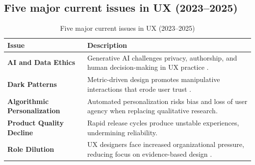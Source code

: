     \subsection{Five major current issues in UX (2023--2025)}
    \begin{table}[H]
        \centering
        \caption{Five major current issues in UX (2023--2025)}
        \begin{tabular}{p{4cm} p{13cm}}
        \hline
        \textbf{Issue} & \textbf{Description} \\
        \hline
        \textbf{AI and Data Ethics} & Generative AI challenges privacy, authorship, and human decision-making in UX practice \cite{shneiderman2022}. \\
        \textbf{Dark Patterns} & Metric-driven design promotes manipulative interactions that erode user trust \cite{mathur2019}. \\
        \textbf{Algorithmic Personalization} & Automated personalization risks bias and loss of user agency when replacing qualitative research. \\
        \textbf{Product Quality Decline} & Rapid release cycles produce unstable experiences, undermining reliability. \\
        \textbf{Role Dilution} & UX designers face increased organizational pressure, reducing focus on evidence-based design \cite{rosenfeld2018}. \\
        \hline
        \end{tabular}
    \end{table}